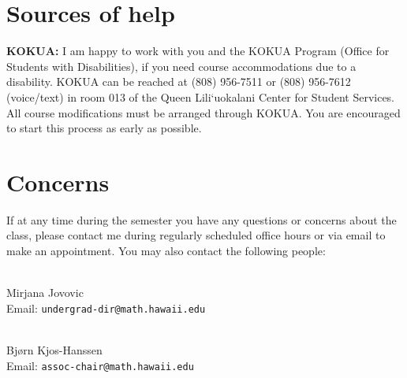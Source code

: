 \documentclass[12pt]{amsart}
\newcommand{\spacer}{\vspace{.2cm}}
\newcommand{\svs}{\vspace{.1cm}}
\begin{document}
\section*{Sources of help}

{\bf KOKUA:} I am happy to work with you and the KOKUA Program (Office for Students with Disabilities), if you need course accommodations due to a disability. KOKUA can be reached at (808) 956-7511 or (808) 956-7612 (voice/text) in room 013 of the Queen Lili`uokalani Center for Student Services. All course modifications must be arranged through KOKUA. You are encouraged to start this process as early as possible.

\section*{Concerns}
If at any time during the semester you have any questions or concerns about the class, please contact me during regularly scheduled office hours or via email to make an appointment. You may also contact the following people:
\spacer

\\
Mirjana Jovovic \\
Email: \texttt{undergrad-dir@math.hawaii.edu}

\svs
{}\\
Bj{\o}rn Kjos-Hanssen \\
Email: \texttt{assoc-chair@math.hawaii.edu}
\end{document}

